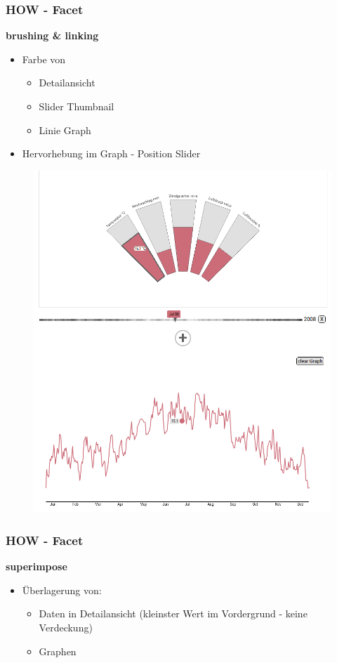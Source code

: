 \documentclass{beamer}
\begin{document}
  \begin{frame}
  \frametitle{HOW - Facet}
    \textbf{brushing \& linking}
    \begin{itemize}
     \item Farbe von
     \begin{itemize}
      \item Detailansicht
      \item Slider Thumbnail
      \item Linie Graph
     \end{itemize}
     \item Hervorhebung im Graph - Position Slider
     \end{itemize}
    \begin{figure}[h]
      \centering
      \includegraphics[width=.3\paperwidth,keepaspectratio=true]{./media/overview_detail.png}
    \end{figure}
  \end{frame}

  \begin{frame}
  \frametitle{HOW - Facet}
    \textbf{superimpose}
    \begin{itemize}
     \item Überlagerung von:
     \begin{itemize}
      \item Daten in Detailansicht (kleinster Wert im Vordergrund - keine Verdeckung)
      \item Graphen
     \end{itemize}
    \end{itemize}
  \end{frame}
\end{document}
